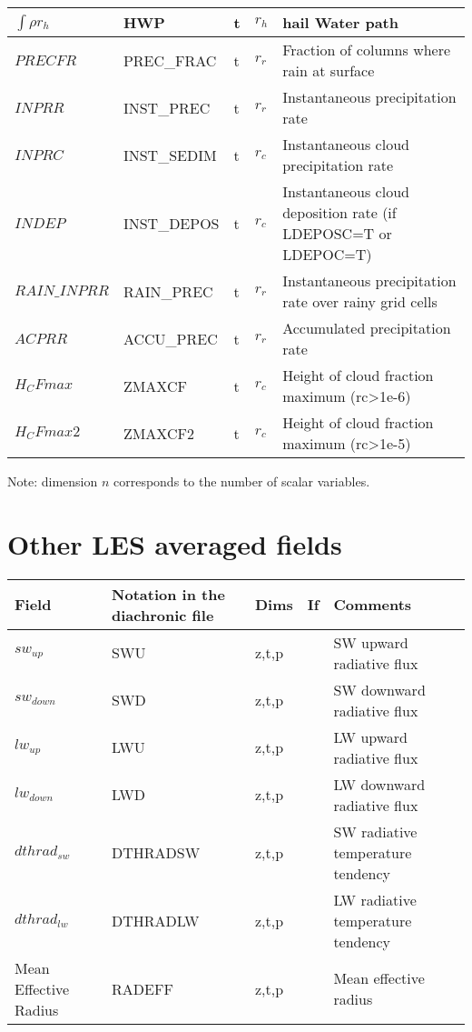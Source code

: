 \begin{longtable}[c]{|p{}|p{}|p{}|p{}|p{}|}
$\int{\rho r_h}$                & HWP         & t   & $r_h$ & hail Water path  \\\hline
$PRECFR$                        & PREC\_FRAC  & t   & $r_r$ & Fraction of columns where rain at surface \\\hline
$INPRR$                         & INST\_PREC  & t   & $r_r$ & Instantaneous precipitation rate  \\\hline
$INPRC$                         & INST\_SEDIM & t   & $r_c$ & Instantaneous cloud precipitation rate  \\\hline
$INDEP$                         & INST\_DEPOS & t   & $r_c$ & Instantaneous cloud deposition rate (if LDEPOSC=T or LDEPOC=T) \\\hline
$RAIN\_INPRR$                   & RAIN\_PREC  & t   & $r_r$ & Instantaneous precipitation rate over rainy grid cells  \\\hline
$ACPRR$                         & ACCU\_PREC  & t   & $r_r$ & Accumulated precipitation rate  \\\hline
$H_CFmax$                       & ZMAXCF      & t   & $r_c$ & Height of cloud fraction maximum  (rc>1e-6) \\\hline
$H_CFmax2$                      & ZMAXCF2     & t   & $r_c$ & Height of cloud fraction maximum  (rc>1e-5) \\\hline
\end{longtable}

Note: dimension $n$ corresponds to the number of scalar variables.


\section{Other LES averaged fields}

\begin{longtable}[c]{|p{}|p{}|p{}|p{}|p{}|}
\hline
Field & Notation in the diachronic file & Dims & If  & Comments \\
\hline \hline
\endhead
$sw_{up}$             & SWU      & z,t,p & & SW upward radiative flux  \\\hline
$sw_{down}$           & SWD      & z,t,p & & SW downward radiative flux  \\\hline
$lw_{up}$             & LWU      & z,t,p & & LW upward radiative flux  \\\hline
$lw_{down}$           & LWD      & z,t,p & & LW downward radiative flux  \\\hline
$dthrad_{sw}$         & DTHRADSW & z,t,p & & SW radiative temperature tendency  \\\hline
$dthrad_{lw}$         & DTHRADLW & z,t,p & & LW radiative temperature tendency  \\\hline
Mean Effective Radius & RADEFF   & z,t,p & & Mean effective radius  \\\hline
\end{longtable}


